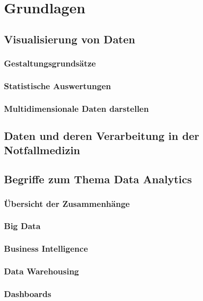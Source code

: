 \chapter{Grundlagen}
\label{chap:Grundlagen}
\minitoc\pagebreak
\lipsum[1-42]

\section{Visualisierung von Daten}
\subsection{Gestaltungsgrundsätze}
\subsection{Statistische Auswertungen}
\subsection{Multidimensionale Daten darstellen}

\section{Daten und deren Verarbeitung in der Notfallmedizin} %

\section{Begriffe zum Thema Data Analytics}
\subsection{Übersicht der Zusammenhänge}
\subsection{Big Data}
\subsection{Business Intelligence}
\subsection{Data Warehousing}
\subsection{Dashboards}
